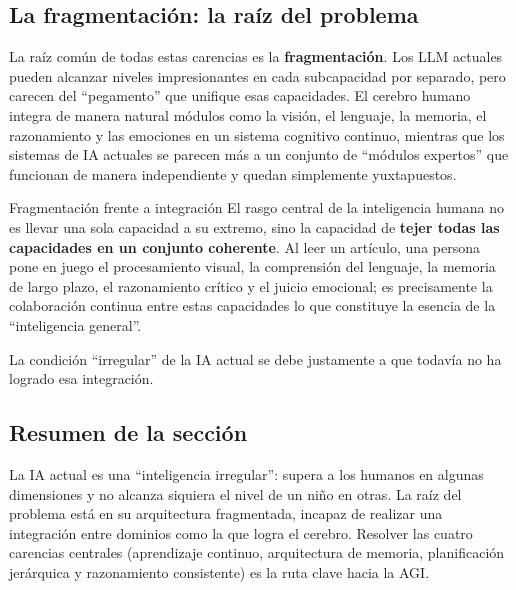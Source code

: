 \subsection{La fragmentación: la raíz del problema}

La raíz común de todas estas carencias es la \textbf{fragmentación}. Los LLM actuales pueden alcanzar niveles impresionantes en cada subcapacidad por separado, pero carecen del ``pegamento'' que unifique esas capacidades. El cerebro humano integra de manera natural módulos como la visión, el lenguaje, la memoria, el razonamiento y las emociones en un sistema cognitivo continuo, mientras que los sistemas de IA actuales se parecen más a un conjunto de ``módulos expertos'' que funcionan de manera independiente y quedan simplemente yuxtapuestos.

\begin{importantbox}{Fragmentación frente a integración}
El rasgo central de la inteligencia humana no es llevar una sola capacidad a su extremo, sino la capacidad de \textbf{tejer todas las capacidades en un conjunto coherente}. Al leer un artículo, una persona pone en juego el procesamiento visual, la comprensión del lenguaje, la memoria de largo plazo, el razonamiento crítico y el juicio emocional; es precisamente la colaboración continua entre estas capacidades lo que constituye la esencia de la ``inteligencia general''.

La condición ``irregular'' de la IA actual se debe justamente a que todavía no ha logrado esa integración.
\end{importantbox}

\subsection{Resumen de la sección}

La IA actual es una ``inteligencia irregular'': supera a los humanos en algunas dimensiones y no alcanza siquiera el nivel de un niño en otras. La raíz del problema está en su arquitectura fragmentada, incapaz de realizar una integración entre dominios como la que logra el cerebro. Resolver las cuatro carencias centrales (aprendizaje continuo, arquitectura de memoria, planificación jerárquica y razonamiento consistente) es la ruta clave hacia la AGI.


